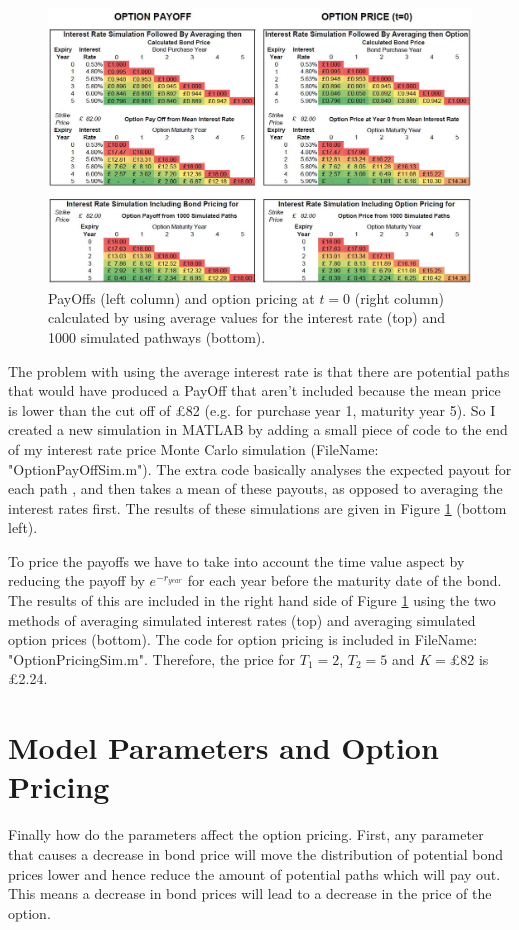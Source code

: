 \documentclass[10pt,a4paper]{article}
\theoremstyle{definition}
\theoremstyle{plain}
\theoremstyle{definition}
\theoremstyle{plain}
\begin{document}
\begin{figure}[h]
	\centering
	\includegraphics[width=1\textwidth]{PayOffandPrice.JPG}
	\caption{PayOffs (left column) and option pricing at $t=0$ (right column) calculated by using average values for the interest rate (top) and 1000 simulated pathways (bottom).}
	\label{fig:PayOffandPrice}
\end{figure}

The problem with using the average interest rate is that there are potential paths that would have produced a PayOff that aren't included because the mean price is lower than the cut off of £82 (e.g. for purchase year 1, maturity year 5). So I created a new simulation in MATLAB by adding a small piece of code to the end of my interest rate price Monte Carlo simulation (FileName: "OptionPayOffSim.m"). The extra code basically analyses the expected payout for each path , and then takes a mean of these payouts, as opposed to averaging the interest rates first. The results of these simulations are given in Figure \ref{fig:PayOffandPrice} (bottom left).

To price the payoffs we have to take into account the time value aspect by reducing the payoff by $e^{-r_{year}}$ for each year before the maturity date of the bond. The results of this are included in the right hand side of Figure \ref{fig:PayOffandPrice} using the two methods of averaging simulated interest rates (top) and averaging simulated option prices (bottom). The code for option pricing is included in FileName: "OptionPricingSim.m". Therefore, the price for $T_{1}=2$, $T_{2}=5$ and $K=$£82 is £2.24.

\section{Model Parameters and Option Pricing}
Finally how do the parameters affect the option pricing. First, any parameter that causes a decrease in bond price will move the distribution of potential bond prices lower and hence reduce the amount of potential paths which will pay out. This means a decrease in bond prices will lead to a decrease in the price of the option.
\end{document}

